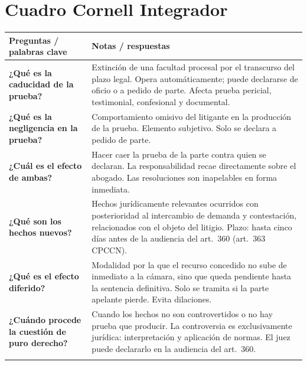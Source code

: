 \documentclass[12pt,oneside]{book}
\begin{document}
\chapter*{Cuadro Cornell Integrador}

\begin{table}[H]
\centering
\begin{tabularx}{\textwidth}{
    >{\raggedright\arraybackslash}p{}
    >{\raggedright\arraybackslash}X
}
\toprule
\textbf{Preguntas / palabras clave} & \textbf{Notas / respuestas} \\
\midrule

\textbf{¿Qué es la caducidad de la prueba?} &
Extinción de una facultad procesal por el transcurso del plazo legal. Opera automáticamente; puede declararse de oficio o a pedido de parte. Afecta prueba pericial, testimonial, confesional y documental. \\
\addlinespace

\textbf{¿Qué es la negligencia en la prueba?} &
Comportamiento omisivo del litigante en la producción de la prueba. Elemento subjetivo. Solo se declara a pedido de parte. \\
\addlinespace

\textbf{¿Cuál es el efecto de ambas?} &
Hacer caer la prueba de la parte contra quien se declaran. La responsabilidad recae directamente sobre el abogado. Las resoluciones son inapelables en forma inmediata. \\
\addlinespace

\textbf{¿Qué son los hechos nuevos?} &
Hechos jurídicamente relevantes ocurridos con posterioridad al intercambio de demanda y contestación, relacionados con el objeto del litigio. Plazo: hasta cinco días antes de la audiencia del art.\ 360 (art.\ 363 CPCCN). \\
\addlinespace

\textbf{¿Qué es el efecto diferido?} &
Modalidad por la que el recurso concedido no sube de inmediato a la cámara, sino que queda pendiente hasta la sentencia definitiva. Solo se tramita si la parte apelante pierde. Evita dilaciones. \\
\addlinespace

\textbf{¿Cuándo procede la cuestión de puro derecho?} &
Cuando los hechos no son controvertidos o no hay prueba que producir. La controversia es exclusivamente jurídica: interpretación y aplicación de normas. El juez puede declararlo en la audiencia del art.\ 360. \\
\addlinespace


\end{tabularx}
\end{table}
\end{document}

